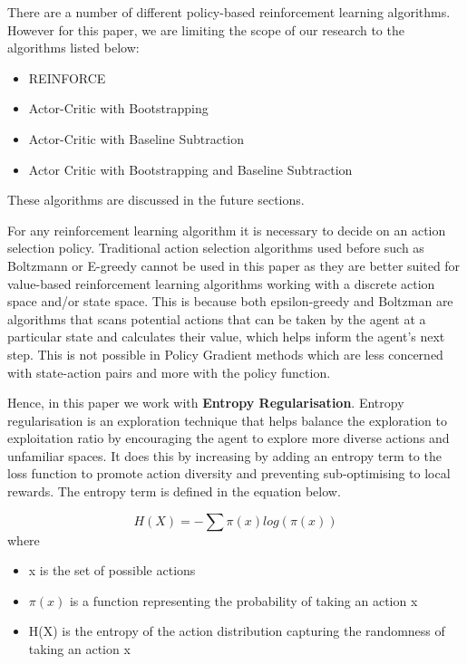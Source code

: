 \documentclass{article}
\begin{document}
\par
There are a number of different policy-based reinforcement learning algorithms. However for this paper, we are limiting the scope of our research to the algorithms listed below: 

\begin{itemize}[itemsep=0pt]
\item REINFORCE
\item Actor-Critic with Bootstrapping
\item Actor-Critic with Baseline Subtraction
\item Actor Critic with Bootstrapping and Baseline Subtraction
\end{itemize}
These algorithms are discussed in the future sections. 

\par For any reinforcement learning algorithm it is necessary to decide on an action selection policy. Traditional action selection algorithms used before such as Boltzmann or E-greedy cannot be used in this paper as they are better suited for value-based reinforcement learning algorithms working with a discrete action space and/or state space. This is because both epsilon-greedy and Boltzman are algorithms that scans potential actions that can be taken by the agent at a particular state and calculates their value, which helps inform the agent's next step. This is not possible in Policy Gradient methods which are less concerned with state-action pairs and more with the policy function. 
\par Hence, in this paper we work with \textbf{Entropy Regularisation}. Entropy regularisation is an exploration technique that helps balance the exploration to exploitation ratio by encouraging the agent to explore more diverse actions and unfamiliar spaces. It does this by increasing by adding an entropy term to the loss function to promote action diversity and preventing sub-optimising to local rewards. The entropy term is defined in the equation below. %

\begin{equation*}
H(X) = - \sum \pi(x) log(\pi(x)) %
\end{equation*}
where
\begin{itemize}[itemsep=0.0pt]
\renewcommand\labelitemi{.}
\item x is the set of possible actions
\item $\pi(x)$ is a function representing the probability of taking an action x
\item H(X) is the entropy of the action distribution capturing the randomness of taking an action x
\end{itemize}
\end{document}
